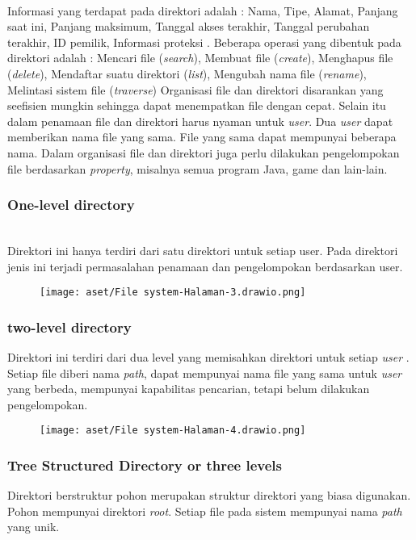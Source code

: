 \documentclass[12pt]{article}
\begin{document}
\begin{itemize}
\begin{figure}[h!]
		\end{figure}
		\\ Informasi yang terdapat pada direktori adalah :  Nama, Tipe, Alamat, Panjang saat ini,  Panjang maksimum, Tanggal akses terakhir, Tanggal perubahan terakhir, ID pemilik, Informasi proteksi . Beberapa operasi yang dibentuk pada direktori adalah : Mencari file (\textit{search}),  Membuat file (\textit{create}), Menghapus file (\textit{delete}), Mendaftar suatu direktori (\textit{list}), Mengubah nama file (\textit{r\textit{ename}}),  Melintasi sistem file (\textit{traverse})   
		Organisasi file dan direktori disarankan yang seefisien mungkin sehingga dapat menempatkan file dengan cepat. Selain itu dalam penamaan file dan direktori harus nyaman untuk\textit{ user}. Dua \textit{user} dapat memberikan nama file yang sama. File yang sama dapat mempunyai beberapa nama. Dalam organisasi file dan direktori juga perlu dilakukan pengelompokan file berdasarkan \textit{property}, misalnya semua program Java, game dan lain-lain. 
		
		\subsubsection{One-level directory}
		\\Direktori ini hanya terdiri dari satu direktori untuk setiap user. Pada direktori jenis ini terjadi permasalahan penamaan dan pengelompokan berdasarkan user. 
		\begin{figure}[h!]
			\centering
			\texttt{[image: aset/File system-Halaman-3.drawio.png]}
			
		\end{figure}
		\subsubsection{two-level directory}
		Direktori ini terdiri dari dua level yang memisahkan direktori untuk setiap \textit{user} . Setiap file diberi nama \textit{path}, dapat mempunyai nama file yang sama untuk \textit{user} yang berbeda, mempunyai kapabilitas pencarian, tetapi belum dilakukan pengelompokan.    \begin{figure}[h!]
			\centering
			\texttt{[image: aset/File system-Halaman-4.drawio.png]}
			
		\end{figure}
		
		\subsubsection{Tree Structured Directory or three levels }
		Direktori berstruktur pohon merupakan struktur direktori yang biasa digunakan. Pohon mempunyai direktori \textit{root}. Setiap file pada sistem mempunyai nama \textit{path} yang unik.
		

\end{itemize}
\end{document}
